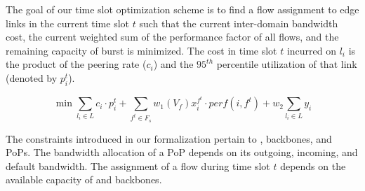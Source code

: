 The goal of our time slot optimization scheme is to find a flow assignment to edge links in the current time slot $t$ such that the current inter-domain bandwidth cost, the current weighted sum of the performance factor of all flows, and the remaining capacity of burst {\egress} is minimized. The cost in time slot $t$ incurred on {\egress} $l_i$ is the product of the peering rate ($c_i$) and the $95^{th}$ percentile utilization of that link (denoted by $p_i^t$). 

$$\min\sum_{l_i \in L} c_i \cdot p_i^t+\sum_{f^t \in F_s} w_1\left(V_f\right) x_i^{f^t}          \cdot perf(i, f^t) +w_2 \sum_{l_i \in L} y_i $$

 The constraints introduced in our formalization pertain to {\egresses}, backbones, and PoPs. The bandwidth allocation of a PoP depends on its outgoing, incoming, and default bandwidth. The assignment of a flow during time slot $t$ depends on the available capacity of {\egresses} and backbones.




